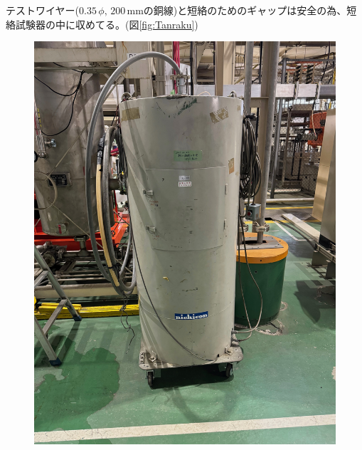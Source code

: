 \documentclass[book,openany]{jlreq}
\theoremstyle{definition}
\begin{document}
テストワイヤー($0.35\,\phi,\, 200\,\mathrm{mm}$の銅線)と短絡のためのギャップは安全の為、短絡試験器の中に収めてる。(図\ref{fig:Tanraku})
%
\begin{figure}[htbp]
  \centering
  \begin{minipage}[b]{0.45\linewidth}
    \centering
    \includegraphics[width=0.9\columnwidth]{./figs/Tanraku1.jpeg}
  \end{minipage}
  \begin{minipage}[b]{0.45\linewidth}
    \centering

\end{minipage}
\end{figure}
\end{document}
